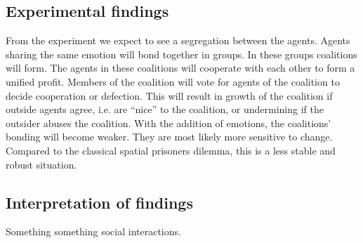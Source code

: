 \subsection*{Experimental findings}

From the experiment we expect to see a segregation between the agents. Agents sharing the same emotion will bond together in groups. In these groups coalitions will form. The agents in these coalitions will cooperate with each other to form a unified profit. Members of the coalition will vote for agents of the coalition to decide cooperation or defection. This will result in growth of the coalition if outside agents agree, i.e. are ``nice'' to the coalition, or undermining if the outsider abuses the coalition. With the addition of emotions, the coalitions' bonding will become weaker. They are most likely more sensitive to change. Compared to the classical spatial prisoners dilemma, this is a less stable and robust situation.

\subsection*{Interpretation of findings}
Something something social interactions.